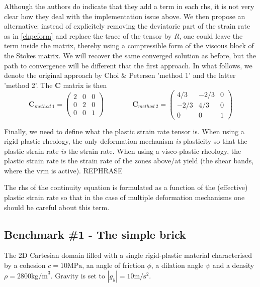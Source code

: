 Although the authors do indicate that they add a term in each rhs, it is not very clear how they deal with
the implementation issue above. We then propose an alternative: instead of explicitely removing the deviatoric 
part of the strain rate as in \eqref{chpeform} and replace the trace of the tensor by $R$, one could 
leave the term inside the matrix, thereby using a compressible form of the viscous block of the Stokes 
matrix. We will recover the same converged solution as before, but the path to convergence will be 
different that the first approach.
In what follows, we denote the original approach by Choi \& Petersen 'method 1' and the latter 'method 2'.
The ${\bm C}$ matrix is then 
\[
{\bm C}_{method\; 1}
=
\left(
\begin{array}{ccc}
2 &0 &0 \\
0 &2 &0 \\
0 &0 &1
\end{array}
\right)
\qquad\qquad
{\bm C}_{method\; 2}
=
\left(
\begin{array}{ccc}
4/3 &-2/3 &0 \\
-2/3 & 4/3 &0 \\
0 &0 &1
\end{array}
\right)
\]


Finally, we need to define what the plastic strain rate tensor is. When using a rigid plastic 
rheology, the only deformation mechanism {\it is} plasticity so that the plastic strain rate {\it is}
the strain rate. When using a visco-plastic rheology, the plastic strain rate is the strain rate 
of the zones above/at yield (the shear bands, where the vrm is active). REPHRASE

\begin{remark}
The rhs of the continuity equation is formulated as a function of the (effective) plastic strain rate so that 
in the case of multiple deformation mechanisms one should be careful about this term.
\end{remark}

\newpage 
\subsection*{Benchmark \#1 - The simple brick}

The 2D Cartesian domain filled with a 
single rigid-plastic material characterised by a cohesion $c=10\text{MPa}$, an 
angle of friction $\phi$, a dilation angle $\psi$ and a density $\rho=2800\text{kg/m}^3$.
Gravity is set to $|g_y|=10\si{\metre\per\square\second}$.

